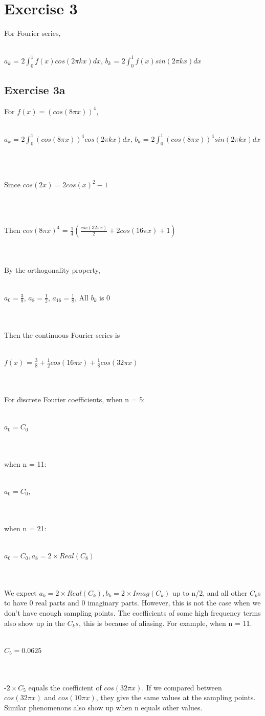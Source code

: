\documentclass[11pt]{article} %
\begin{document}
\section{Exercise 3}
For Fourier series,\\\\
\centerline{$a_{k}$ = $2\int_{0}^{1}f(x)cos(2\pi k x)dx$, $b_{k}$ = $2\int_{0}^{1}f(x)sin(2\pi k x)dx$}
\subsection{Exercise 3a}
For $f(x)=(cos(8\pi x))^{4}$, \\\\
\centerline{$a_{k}$ = $2\int_{0}^{1}(cos(8\pi x))^{4}cos(2\pi k x)dx$, $b_{k}$ = $2\int_{0}^{1}(cos(8\pi x))^{4}sin(2\pi k x)dx$}\\\\
\centerline{Since $cos(2x) = 2cos(x)^{2}-1$}\\\\
\centerline{Then $cos(8\pi x)^{4}$ = $\frac{1}{4}(\frac{cos(32\pi x)}{2}+2cos(16\pi x)+1)$}\\\\
By the orthogonality property,\\\\
\centerline{$a_{0} = \frac{3}{8}$, $a_{8} = \frac{1}{2}$, $a_{16} = \frac{1}{8}$, All $b_{k}$ is 0}\\\\
Then the continuous Fourier series is\\\\
\centerline{$f(x)$ = $\frac{3}{8} + \frac{1}{2}cos(16\pi x)+\frac{1}{8}cos(32\pi x)$}\\\\
For discrete Fourier coefficients, when n = 5:\\\\
\centerline{$a_{0} = C_{0}$}\\\\
when n = 11:\\\\
\centerline{$a_{0} = C_{0},$}\\\\
when n = 21:\\\\
\centerline{$a_{0} = C_{0}, a_{8} = 2\times Real(C_{8})$}\\\\
We expect $a_{k} = 2\times Real(C_{k}), b_{k} = 2\times Imag(C_{k})$ up to n/2, and all other $C_{k}$s to have 0 real parts and 0 imaginary parts. However, this is not the case when we don't have enough sampling points. The coefficients of some high frequency terms also show up in the $C_{k}s$, this is because of aliasing. For example, when n = 11.\\\\
\centerline{$C_{5} = 0.0625$}\\\\
 -$2\times C_{5}$ equals the coefficient of $cos(32\pi x)$. If we compared between $cos(32\pi x)$ and $cos(10\pi x)$, they give the same values at the sampling points. Similar phenomenons also show up when n equals other values.
\end{document}
